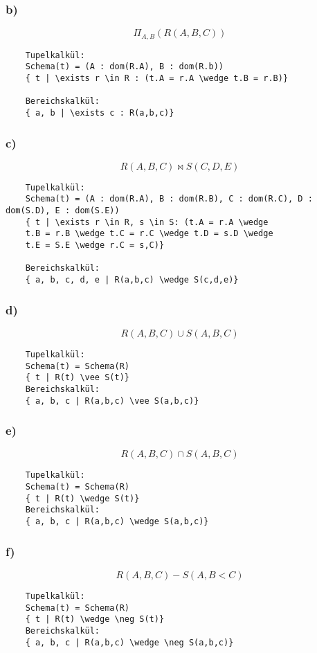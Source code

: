 \subsubsection{b)}
\[\Pi_{A,B}(R(A,B,C))\]
\begin{verbatim}
    Tupelkalkül:
    Schema(t) = (A : dom(R.A), B : dom(R.b))
    { t | \exists r \in R : (t.A = r.A \wedge t.B = r.B)}

    Bereichskalkül:
    { a, b | \exists c : R(a,b,c)}
\end{verbatim}

\subsubsection{c)}
\[R(A,B,C)\bowtie S(C,D,E)\]
\begin{verbatim}
    Tupelkalkül:
    Schema(t) = (A : dom(R.A), B : dom(R.B), C : dom(R.C), D : dom(S.D), E : dom(S.E))
    { t | \exists r \in R, s \in S: (t.A = r.A \wedge
    t.B = r.B \wedge t.C = r.C \wedge t.D = s.D \wedge
    t.E = S.E \wedge r.C = s,C)}

    Bereichskalkül:
    { a, b, c, d, e | R(a,b,c) \wedge S(c,d,e)}
\end{verbatim}

\subsubsection{d)}
\[R(A,B,C)\cup S(A,B,C)\]
\begin{verbatim}
    Tupelkalkül:
    Schema(t) = Schema(R)
    { t | R(t) \vee S(t)}
    Bereichskalkül:
    { a, b, c | R(a,b,c) \vee S(a,b,c)}
\end{verbatim}

\subsubsection{e)}
\[R(A,B,C)\cap S(A,B,C)\]
\begin{verbatim}
    Tupelkalkül:
    Schema(t) = Schema(R)
    { t | R(t) \wedge S(t)}
    Bereichskalkül:
    { a, b, c | R(a,b,c) \wedge S(a,b,c)}
\end{verbatim}

\subsubsection{f)}
\[R(A,B,C) - S(A,B<C)\]
\begin{verbatim}
    Tupelkalkül:
    Schema(t) = Schema(R)
    { t | R(t) \wedge \neg S(t)}
    Bereichskalkül:
    { a, b, c | R(a,b,c) \wedge \neg S(a,b,c)}
\end{verbatim}

